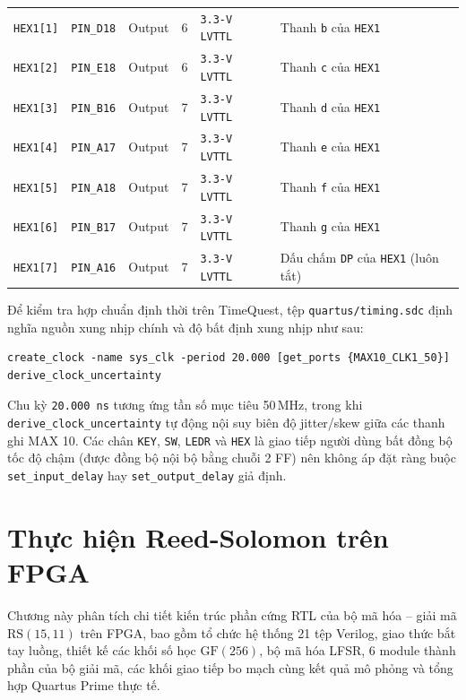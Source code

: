 \begin{table}[!htb]
\begin{tabular}{l c c c l p{4.6cm}}
        \texttt{HEX1[1]} & \texttt{PIN\_D18} & Output & 6 & \texttt{3.3-V LVTTL} & Thanh \texttt{b} của \texttt{HEX1} \\
        \texttt{HEX1[2]} & \texttt{PIN\_E18} & Output & 6 & \texttt{3.3-V LVTTL} & Thanh \texttt{c} của \texttt{HEX1} \\
        \texttt{HEX1[3]} & \texttt{PIN\_B16} & Output & 7 & \texttt{3.3-V LVTTL} & Thanh \texttt{d} của \texttt{HEX1} \\
        \texttt{HEX1[4]} & \texttt{PIN\_A17} & Output & 7 & \texttt{3.3-V LVTTL} & Thanh \texttt{e} của \texttt{HEX1} \\
        \texttt{HEX1[5]} & \texttt{PIN\_A18} & Output & 7 & \texttt{3.3-V LVTTL} & Thanh \texttt{f} của \texttt{HEX1} \\
        \texttt{HEX1[6]} & \texttt{PIN\_B17} & Output & 7 & \texttt{3.3-V LVTTL} & Thanh \texttt{g} của \texttt{HEX1} \\
        \texttt{HEX1[7]} & \texttt{PIN\_A16} & Output & 7 & \texttt{3.3-V LVTTL} & Dấu chấm \texttt{DP} của \texttt{HEX1} (luôn tắt) \\
        \bottomrule
    \end{tabular}
\end{table}

Để kiểm tra hợp chuẩn định thời trên TimeQuest, tệp \texttt{quartus/timing.sdc} định nghĩa nguồn xung nhịp chính và độ bất định xung nhịp như sau:
\begin{lstlisting}[numbers=none]
create_clock -name sys_clk -period 20.000 [get_ports {MAX10_CLK1_50}]
derive_clock_uncertainty
\end{lstlisting}
Chu kỳ \texttt{20.000 ns} tương ứng tần số mục tiêu 50\,MHz, trong khi \texttt{derive\_clock\_uncertainty} tự động nội suy biên độ jitter/skew giữa các thanh ghi MAX 10. Các chân \texttt{KEY}, \texttt{SW}, \texttt{LEDR} và \texttt{HEX} là giao tiếp người dùng bất đồng bộ tốc độ chậm (được đồng bộ nội bộ bằng chuỗi 2 FF) nên không áp đặt ràng buộc \texttt{set\_input\_delay} hay \texttt{set\_output\_delay} giả định.


\chapter{Thực hiện Reed-Solomon trên FPGA}
\label{ch:rs-fpga}

Chương này phân tích chi tiết kiến trúc phần cứng RTL của bộ mã hóa -- giải mã $\mathrm{RS}(15,11)$ trên FPGA, bao gồm tổ chức hệ thống 21 tệp Verilog, giao thức bắt tay luồng, thiết kế các khối số học $\mathrm{GF}(256)$, bộ mã hóa LFSR, 6 module thành phần của bộ giải mã, các khối giao tiếp bo mạch cùng kết quả mô phỏng và tổng hợp Quartus Prime thực tế.

